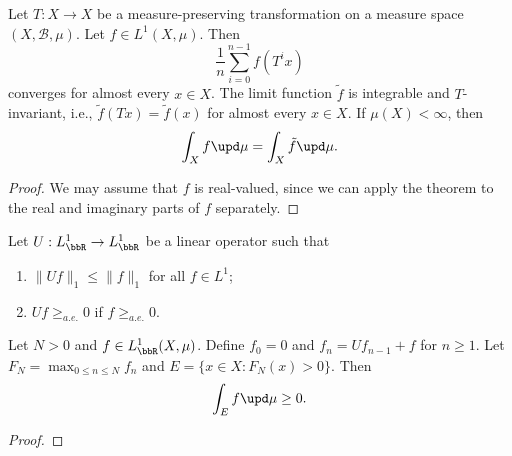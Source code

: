     \begin{theorem}\label{thm:Birkhoff_Ergodic_Theorem}
        Let \(T:X\to X\) be a measure-preserving transformation on a measure space \((X, \mathcal{B}, \mu)\). 
        Let \(f\in L^1(X, \mu)\). 
        Then 
        \[ \frac{1}{n} \sum_{i=0}^{n-1} f(T^i x) \]
        converges for almost every \(x\in X\).
        The limit function \(\tilde{f}\) is integrable and \(T\)-invariant, i.e., \(\tilde{f}(Tx) = \tilde{f}(x)\) for almost every \(x\in X\).
        If \(\mu(X) < \infty\), then
        \[ \int_X f \upd\mu = \int_X \tilde{f} \upd\mu. \]
    \end{theorem}
    \begin{proof}
        We may assume that \(f\) is real-valued, since we can apply the theorem to the real and imaginary parts of \(f\) separately.

    \end{proof}

    \begin{theorem}\label{thm:Maximal_Ergodic_Theorem}
        Let \(U: L_\bbR^1 \to L_\bbR^1\) be a linear operator such that
        \begin{enumerate}
            \item \(\|Uf\|_1 \leq \|f\|_1\) for all \(f\in L^1\);
            \item \(Uf \geq_{a.e.} 0\) if \(f\geq_{a.e.} 0\).
        \end{enumerate}
        Let \(N>0\) and \(f \in L^1_\bbR(X, \mu)\). 
        Define \(f_0 = 0\) and \(f_n = Uf_{n-1} + f\) for \(n\geq 1\).
        Let \(F_N = \max_{0\leq n \leq N} f_n\) and \(E = \{x\in X: F_N(x) > 0\}\).
        Then 
        \[
            \int_E f \upd\mu \geq 0.
        \]
    \end{theorem}
    \begin{proof}
    \end{proof}